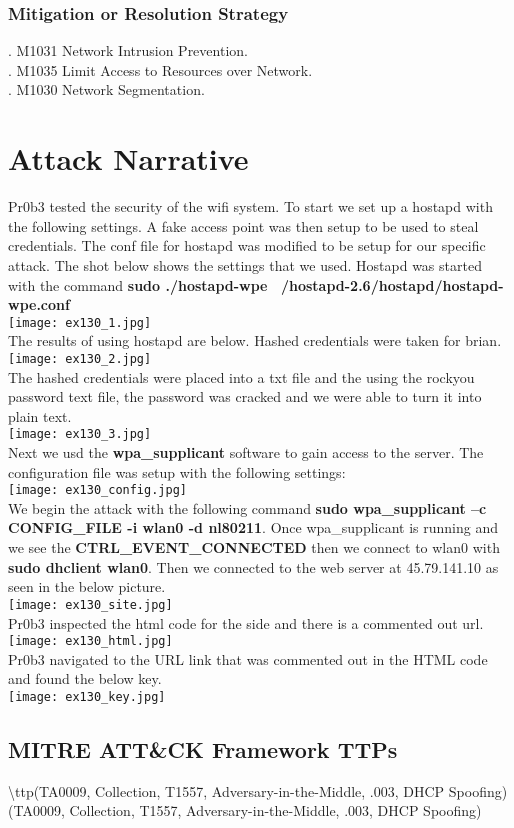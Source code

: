 \documentclass[notitlepage]{article}
\begin{document}
	\subsubsection{Mitigation or Resolution Strategy}
	. M1031 Network Intrusion Prevention. \\
	. M1035 Limit Access to Resources over Network. \\  
	. M1030 Network Segmentation. \\
	
	\section{Attack Narrative}
	
	\indent Pr0b3 tested the security of the wifi system.  To start we set up a  hostapd with the following settings. A fake access point was then setup to be used to steal credentials. The conf file for hostapd was modified to be setup for our specific attack. The shot below shows the settings that we used. Hostapd  was started with the command \textbf{sudo ./hostapd-wpe ~/hostapd-2.6/hostapd/hostapd-wpe.conf}  \\
		\texttt{[image: ex130\_1.jpg]} \\
	\indent The results of using hostapd are below. Hashed credentials were taken for brian.  \\
	\texttt{[image: ex130\_2.jpg]} \\
	\indent The hashed credentials were placed into a txt file and the using the rockyou password text file, the password was cracked and we were able to turn it into plain text.    \\
	\texttt{[image: ex130\_3.jpg]} \\
	\indent Next we usd the \textbf{wpa\_supplicant} software to gain access to the server. The configuration file was setup with the following settings:    \\
	\texttt{[image: ex130\_config.jpg]} \\
	\indent We begin the attack with the following command \textbf{sudo wpa\_supplicant --c CONFIG\_FILE -i wlan0 -d nl80211}. Once wpa\_supplicant is running and we see the \textbf{CTRL\_EVENT\_CONNECTED} then we connect to wlan0 with \textbf{sudo dhclient wlan0}. Then we connected to the web server at 45.79.141.10 as seen in the below picture. \\
	\texttt{[image: ex130\_site.jpg]} \\
	\indent Pr0b3 inspected the html code for the side and there is a commented out url.\\
	\texttt{[image: ex130\_html.jpg]} \\
	\indent Pr0b3 navigated to the URL link that was commented out in the HTML code and found the below key. \\
	\texttt{[image: ex130\_key.jpg]} \\
	

	
	\subsection{MITRE ATT{\&}CK Framework TTPs}
	
	\indent\textbackslash ttp(TA0009, Collection, T1557, Adversary-in-the-Middle, .003, DHCP Spoofing) \\
	\ttp(TA0009, Collection, T1557, Adversary-in-the-Middle, .003, DHCP Spoofing) \\
	
\end{document}
